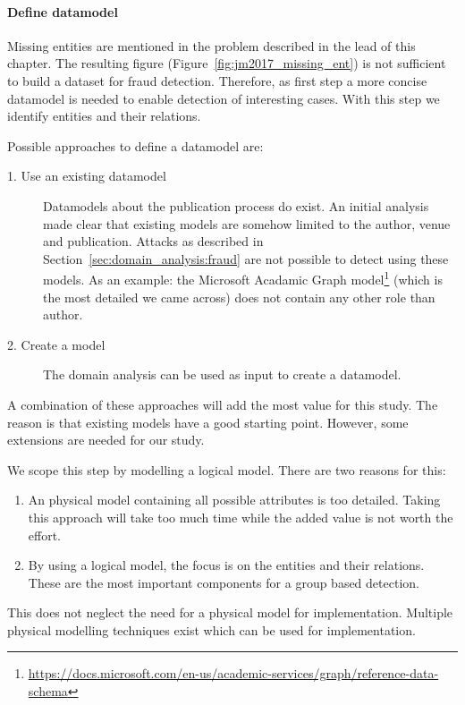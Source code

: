 \documentclass{ou-report}
\begin{document}
\paragraph{Define datamodel}
Missing entities are mentioned in the problem described in the lead of this 
chapter. The resulting figure
(Figure~\ref{fig:jm2017_missing_ent}) is not sufficient to build a dataset 
for fraud detection. Therefore, as first step a more concise datamodel is needed
to enable detection of interesting cases. With this step we identify entities
and their relations.

Possible approaches to define a datamodel are:
\begin{description}
    \item[1. Use an existing datamodel] Datamodels about the publication process
    do exist. An initial analysis made clear that existing models are
    somehow limited to the author, venue and publication. Attacks as described
    in Section~\ref{sec:domain_analysis:fraud} are not possible to detect using 
    these models. As an example: the Microsoft Acadamic Graph 
    model\footnote{\url{https://docs.microsoft.com/en-us/academic-services/graph/reference-data-schema}} 
    (which is the most detailed we came across) does not contain any other role 
    than author.
    \item[2. Create a model]  The domain analysis can be used as input to create
    a datamodel.
\end{description}

A combination of these approaches will add the most value for this study. The 
reason is that existing models have a good starting point. However, some 
extensions are needed for our study. 

We scope this step by modelling a logical model. There are two reasons for this:
\begin{enumerate}
    \item An physical model containing all possible attributes is too 
        detailed. Taking this approach will take too much time while the added
        value is not worth the effort.
    \item By using a logical model, the focus is on the entities and their
        relations. These are the most important components for a group based
        detection.
\end{enumerate}

This does not neglect the need for a physical model for implementation. 
Multiple physical modelling techniques exist which can be used for 
implementation.
\end{document}
